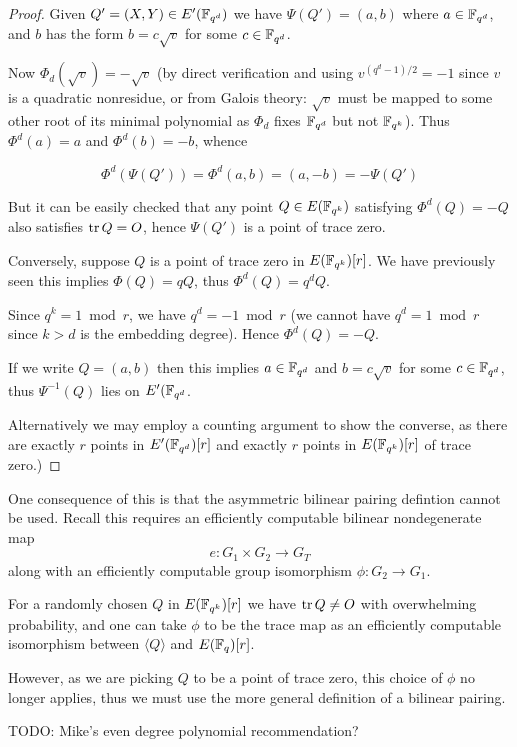 \begin{proof}
Given $Q' = (X,Y) \in E'(\mathbb{F}_{q^d})$ we have $\Psi(Q') = (a, b)$
where $a \in \mathbb{F}_{q^d}$, and $b$ has the form $b = c \sqrt{v}$ for some
$c \in \mathbb{F}_{q^d}$.

Now $\Phi_d(\sqrt{v}) = -\sqrt{v}$ (by direct verification and using
$v^{(q^d - 1)/2} = -1$ since $v$ is a quadratic nonresidue, or
from Galois theory: $\sqrt{v}$ must
be mapped to some other root of its minimal polynomial as $\Phi_d$ fixes
$\mathbb{F}_{q^d}$ but not $\mathbb{F}_{q^k}$).
Thus $\Phi^d(a) = a$ and $\Phi^d(b) = -b$, whence

\[ \Phi^d(\Psi(Q')) = \Phi^d(a,b) = (a, -b) = -\Psi(Q') \]

But it can be easily checked that
any point $Q \in E(\mathbb{F}_{q^k})$ satisfying $\Phi^d(Q) = -Q$ also satisfies
$\mathop{\rm tr} Q = O$, hence $\Psi(Q')$ is a point of trace zero.

Conversely, suppose $Q$ is a point of trace zero in $E(\mathbb{F}_{q^k})[r]$.
We have previously seen this implies $\Phi(Q) = q Q$,
thus $\Phi^d(Q) = q^d Q$.

Since $q^k = 1 \bmod r$, we have $q^d = -1 \bmod r$ (we cannot
have $q^d = 1 \bmod r$ since $k > d$ is the embedding degree).
Hence $\Phi^d(Q) = -Q$.

If we write $Q=(a,b)$ then this implies $a \in \mathbb{F}_{q^d}$ and $b = c \sqrt{v}$
for some $c \in \mathbb{F}_{q^d}$, thus $\Psi^{-1}(Q)$ lies on $E'(\mathbb{F}_{q^d}$.

Alternatively we may employ a counting argument to show the converse,
as there are exactly
$r$ points in $E'(\mathbb{F}_{q^d})[r]$ and exactly $r$ points in $E(\mathbb{F}_{q^k})[r]$ of trace
zero.)
\end{proof}

One consequence of this is that the asymmetric bilinear pairing defintion
cannot be used. Recall this requires an efficiently
computable bilinear nondegenerate map
\[
e:G_1 \times G_2 \rightarrow G_T
\]
along with an efficiently computable group isomorphism
$\phi : G_2 \rightarrow G_1$.

For a randomly chosen $Q$ in $E(\mathbb{F}_{q^k})[r]$ we have $\mathop{\rm tr} Q \ne O$ with
overwhelming probability, and one can take $\phi$ to be the trace map
as an efficiently computable isomorphism between $\langle Q \rangle$
and $E(\mathbb{F}_q)[r]$.

However, as we are picking $Q$ to be a point of trace zero, this choice
of $\phi$ no longer applies, thus we must use the more general definition
of a bilinear pairing.

TODO: Mike's even degree polynomial recommendation?

